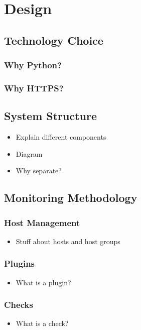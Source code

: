 \documentclass[bsc,logo,twoside]{infthesis}
\begin{document}
\chapter{Design}
\section{Technology Choice}
\subsection{Why Python?}
\subsection{Why HTTPS?}

\section{System Structure}
\begin{itemize}
	\item Explain different components
	\item Diagram
	\item Why separate?
\end{itemize}

\section{Monitoring Methodology}
\subsection{Host Management}
\begin{itemize}
	\item Stuff about hosts and host groups
\end{itemize}

\subsection{Plugins}
\begin{itemize}
	\item What is a plugin?
\end{itemize}

\subsection{Checks}
\begin{itemize}
	\item What is a check?
\end{itemize}
\end{document}

